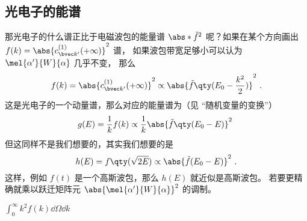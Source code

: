 
\subsection{光电子的能谱}
那光电子的什么谱正比于电磁波包的能量谱 $\abs*{\tilde f}^2$ 呢？如果在某个方向画出 $f(k) = \abs{c_{\bvec k'}^{(1)}(+\infty)}^2$ 谱， 如果波包带宽足够小可以认为 $\mel{\alpha'}{W}{\alpha}$ 几乎不变， 那么
\begin{equation}
f(k) = \abs{c_{\bvec k'}^{(1)}(+\infty)}^2 \propto \abs{\tilde f\qty(E_0-\frac{k^2}{2})}^2~.
\end{equation}
这是光电子的一个动量谱，那么对应的能量谱为（见 “随机变量的变换”）
\begin{equation}
g(E) = \frac{1}{k}f(k) \propto \frac{1}{k}\abs{\tilde f\qty(E_0-E)}^2~
\end{equation}
但这同样不是我们想要的，其实我们想要的是
\begin{equation}
h(E) = f\qty(\sqrt{2E}) \propto \abs{\tilde f(E_0-E)}^2~.
\end{equation}
这样，例如 $f(t)$ 是一个高斯波包，那么 $h(E)$ 就近似是高斯波包。 若要更精确就乘以跃迁矩阵元 $\abs{\mel{\alpha'}{W}{\alpha}}^2$ 的调制。

$\displaystyle\int_0^\infty k^2 f(k) \dd{\Omega}\dd{k}$